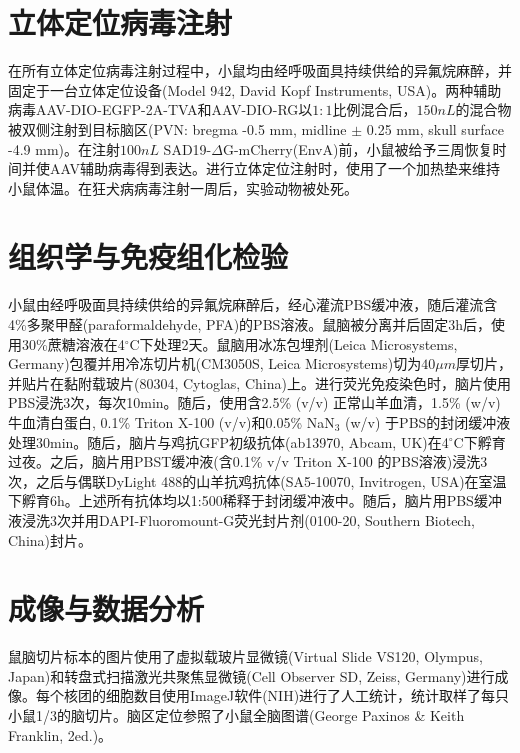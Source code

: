 \section{立体定位病毒注射}
在所有立体定位病毒注射过程中，小鼠均由经呼吸面具持续供给的异氟烷麻醉，并固定于一台立体定位设备(Model 942, David Kopf Instruments, USA)。两种辅助病毒AAV-DIO-EGFP-2A-TVA和AAV-DIO-RG以$1:1$比例混合后，$150nL$的混合物被双侧注射到目标脑区(PVN: bregma -0.5 mm, midline $\pm$ 0.25 mm, skull surface -4.9 mm)。在注射$100 nL$ SAD19-$\Delta$G-mCherry(EnvA)前，小鼠被给予三周恢复时间并使AAV辅助病毒得到表达。进行立体定位注射时，使用了一个加热垫来维持小鼠体温。在狂犬病病毒注射一周后，实验动物被处死。

\section{组织学与免疫组化检验}
小鼠由经呼吸面具持续供给的异氟烷麻醉后，经心灌流PBS缓冲液，随后灌流含4\%多聚甲醛(paraformaldehyde, PFA)的PBS溶液。鼠脑被分离并后固定3h后，使用30\%蔗糖溶液在4$^\circ$C下处理2天。鼠脑用冰冻包埋剂(Leica Microsystems, Germany)包覆并用冷冻切片机(CM3050S, Leica Microsystems)切为$40\mu m$厚切片，并贴片在黏附载玻片(80304, Cytoglas, China)上。进行荧光免疫染色时，脑片使用PBS浸洗3次，每次10min。随后，使用含2.5\% (v/v) 正常山羊血清，1.5\% (w/v) 牛血清白蛋白, 0.1\% Triton\texttrademark{} X-100 (v/v)和0.05\% NaN$_3$ (w/v) 于PBS的封闭缓冲液处理30min。随后，脑片与鸡抗GFP初级抗体(ab13970, Abcam, UK)在4$^\circ$C下孵育过夜。之后，脑片用PBST缓冲液(含0.1\% v/v Triton\texttrademark{} X-100 的PBS溶液)浸洗3次，之后与偶联DyLight 488的山羊抗鸡抗体(SA5-10070, Invitrogen, USA)在室温下孵育6h。上述所有抗体均以1:500稀释于封闭缓冲液中。随后，脑片用PBS缓冲液浸洗3次并用DAPI-Fluoromount-G荧光封片剂(0100-20, Southern Biotech, China)封片。

\section{成像与数据分析}
鼠脑切片标本的图片使用了虚拟载玻片显微镜(Virtual Slide VS120, Olympus, Japan)和转盘式扫描激光共聚焦显微镜(Cell Observer SD, Zeiss, Germany)进行成像。每个核团的细胞数目使用ImageJ软件(NIH)进行了人工统计，统计取样了每只小鼠1/3的脑切片。脑区定位参照了小鼠全脑图谱(George Paxinos \& Keith Franklin, 2ed.)。
